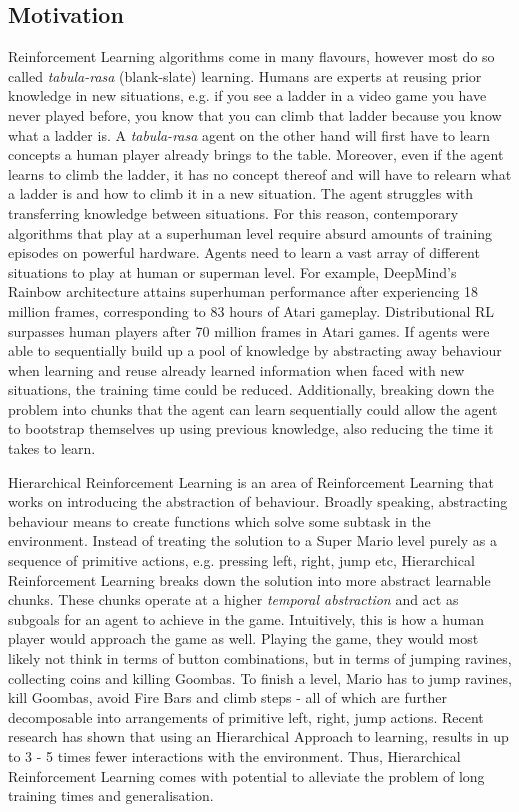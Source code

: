 \documentclass[notitlepage,a4paper,11pt]{article}
\begin{document}
\subsection{Motivation}
Reinforcement Learning algorithms come in many flavours, however most do so called \textit{tabula-rasa} (blank-slate) learning. Humans are experts at reusing prior knowledge in new situations, e.g. if you see a ladder in a video game you have never played before, you know that you can climb that ladder because you know what a ladder is. A \textit{tabula-rasa} agent on the other hand will first have to learn concepts a human player already brings to the table. Moreover, even if the agent learns to climb the ladder, it has no concept thereof and will have to relearn what a ladder is and how to climb it in a new situation. The agent struggles with transferring knowledge between situations. For this reason, contemporary algorithms that play at a superhuman level require absurd amounts of training episodes on powerful hardware. Agents need to learn a vast array of different situations to play at human or superman level. For example, DeepMind's Rainbow architecture \cite{hessel2018rainbow} attains superhuman performance after experiencing 18 million frames, corresponding to 83 hours of Atari gameplay. Distributional RL \cite{bellemare2017distributional} surpasses human players after 70 million frames in Atari games. If agents were able to sequentially build up a pool of knowledge by abstracting away behaviour when learning and reuse already learned information when faced with new situations, the training time could be reduced. Additionally, breaking down the problem into chunks that the agent can learn sequentially could allow the agent to bootstrap themselves up using previous knowledge, also reducing the time it takes to learn.

Hierarchical Reinforcement Learning is an area of Reinforcement Learning that works on introducing the abstraction of behaviour. Broadly speaking, abstracting behaviour means to create functions which solve some subtask in the environment. Instead of treating the solution to a Super Mario level purely as a sequence of primitive actions, e.g. pressing left, right, jump etc, Hierarchical Reinforcement Learning breaks down the solution into more abstract learnable chunks. These chunks operate at a higher \textit{temporal abstraction} and act as subgoals for an agent to achieve in the game. Intuitively, this is how a human player would approach the game as well. Playing the game, they would most likely not think in terms of button combinations, but in terms of jumping ravines, collecting coins and killing Goombas. To finish a level, Mario has to jump ravines, kill Goombas, avoid Fire Bars and climb steps - all of which are further decomposable into arrangements of primitive left, right, jump actions. Recent research \cite{nachum2019does} has shown that using an Hierarchical Approach to learning, results in up to 3 - 5 times fewer interactions with the environment. Thus, Hierarchical Reinforcement Learning comes with potential to alleviate the problem of long training times and generalisation. 
\end{document}
